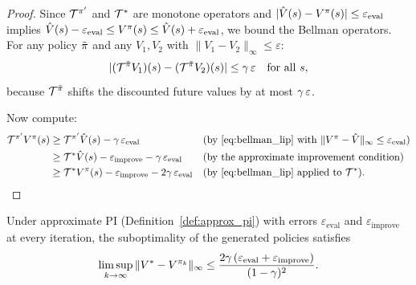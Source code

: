 \documentclass[11pt,a4paper]{article}
\begin{document}
\begin{proof}
Since $\mathcal{T}^{\pi'}$ and $\mathcal{T}^*$ are monotone operators
and $|\hat{V}(s) - V^\pi(s)| \leq \varepsilon_{\mathrm{eval}}$
implies
$\hat{V}(s) - \varepsilon_{\mathrm{eval}} \leq V^\pi(s) \leq
\hat{V}(s) + \varepsilon_{\mathrm{eval}}$,
we bound the Bellman operators. For any policy $\tilde{\pi}$ and
any $V_1, V_2$ with $\|V_1 - V_2\|_\infty \leq \varepsilon$:
\begin{equation}
  |(\mathcal{T}^{\tilde{\pi}} V_1)(s)
  - (\mathcal{T}^{\tilde{\pi}} V_2)(s)|
  \leq \gamma\,\varepsilon
  \quad \text{for all } s,
  \label{eq:bellman_lip}
\end{equation}
because $\mathcal{T}^{\tilde{\pi}}$ shifts the discounted future
values by at most $\gamma\,\varepsilon$.

Now compute:
\begin{align}
  \mathcal{T}^{\pi'} V^\pi(s)
  &\geq \mathcal{T}^{\pi'} \hat{V}(s)
    - \gamma\,\varepsilon_{\mathrm{eval}}
  &&\text{(by~\eqref{eq:bellman_lip} with
    $\|V^\pi - \hat{V}\|_\infty \leq \varepsilon_{\mathrm{eval}}$)}
    \nonumber\\
  &\geq \mathcal{T}^* \hat{V}(s)
    - \varepsilon_{\mathrm{improve}}
    - \gamma\,\varepsilon_{\mathrm{eval}}
  &&\text{(by the approximate improvement condition)}
    \nonumber\\
  &\geq \mathcal{T}^* V^\pi(s)
    - \varepsilon_{\mathrm{improve}}
    - 2\gamma\,\varepsilon_{\mathrm{eval}}
  &&\text{(by~\eqref{eq:bellman_lip} applied to $\mathcal{T}^*$).}
    \qedhere
\end{align}
\end{proof}

\begin{keyresult}[title={Error Propagation Theorem for Approximate PI}]
\begin{theorem}
\label{thm:error_propagation}
Under approximate PI (Definition~\ref{def:approx_pi}) with errors
$\varepsilon_{\mathrm{eval}}$ and $\varepsilon_{\mathrm{improve}}$
at every iteration, the suboptimality of the generated policies
satisfies
\begin{equation}
  \limsup_{k \to \infty} \|V^* - V^{\pi_k}\|_\infty
  \leq \frac{2\gamma\,(\varepsilon_{\mathrm{eval}}
  + \varepsilon_{\mathrm{improve}})}{(1-\gamma)^2}.
  \label{eq:error_bound}
\end{equation}
\end{theorem}
\end{keyresult}
\end{document}
